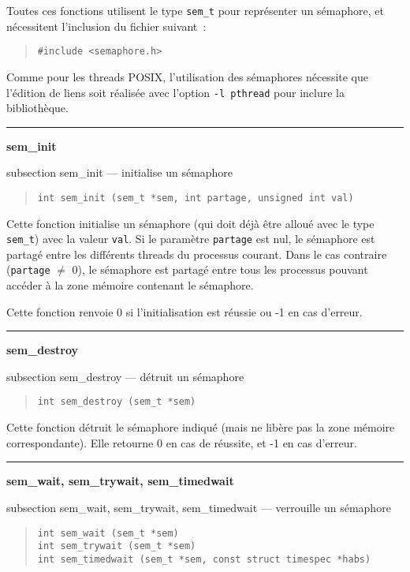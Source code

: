 \documentclass [twoside] {report}
\newcommand {\primitive} [1]
    {
	{\large \bf #1}
	\addcontentsline {toc} {subsection} {#1}
    }
\newcommand {\separation}
    {
	\vspace {7mm}
	\nopagebreak
	\hrule
    }
\begin{document}
Toutes ces fonctions utilisent le type \texttt {sem\_t} pour représenter
un sémaphore, et nécessitent l'inclusion du fichier suivant~:

\begin {quote}
\begin {verbatim}
#include <semaphore.h>
\end{verbatim}
\end {quote}

Comme pour les threads POSIX, l'utilisation des sémaphores nécessite
que l'édition de liens soit réalisée avec l'option \verb|-l pthread|
pour inclure la bibliothèque.


\separation
\primitive {sem\_init} --- initialise un sémaphore

\begin {quote}
\begin {verbatim}
int sem_init (sem_t *sem, int partage, unsigned int val)
\end{verbatim}
\end {quote}

Cette fonction initialise un sémaphore (qui doit déjà être alloué
avec le type \texttt {sem\_t}) avec la valeur \texttt {val}. Si le
paramètre \texttt {partage} est nul, le sémaphore est partagé entre les
différents threads du processus courant. Dans le cas contraire (\texttt
{partage} $\neq$ 0), le sémaphore est partagé entre tous les processus
pouvant accéder à la zone mémoire contenant le sémaphore.

Cette fonction renvoie 0 si l'initialisation est réussie
ou -1 en cas d'erreur.


\separation
\primitive {sem\_destroy} --- détruit un sémaphore

\begin {quote}
\begin {verbatim}
int sem_destroy (sem_t *sem)
\end{verbatim}
\end {quote}

Cette fonction détruit le sémaphore indiqué (mais ne libère pas
la zone mémoire correspondante). Elle retourne 0 en cas de réussite,
et -1 en cas d'erreur.


\separation
\primitive {sem\_wait, sem\_trywait, sem\_timedwait} --- verrouille un sémaphore

\begin {quote}
\begin {verbatim}
int sem_wait (sem_t *sem)
int sem_trywait (sem_t *sem)
int sem_timedwait (sem_t *sem, const struct timespec *habs)
\end{verbatim}
\end {quote}
\end{document}
